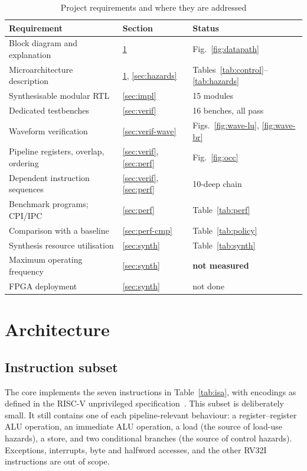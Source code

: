 \documentclass[conference]{IEEEtran}
\begin{document}
\begin{table}[t]
\centering
\caption{Project requirements and where they are addressed}
\label{tab:compliance}
\footnotesize
\begin{tabular}{@{}L{3.55cm}L{1.15cm}p{2.6cm}@{}}
\toprule
Requirement & Section & Status \\
\midrule
Block diagram and explanation & \ref{sec:arch} & Fig.~\ref{fig:datapath} \\
Microarchitecture description & \ref{sec:arch}, \ref{sec:hazards} & Tables~\ref{tab:control}--\ref{tab:hazards} \\
Synthesisable modular RTL & \ref{sec:impl} & 15 modules \\
Dedicated testbenches & \ref{sec:verif} & 16 benches, all pass \\
Waveform verification & \ref{sec:verif-wave} & Figs.~\ref{fig:wave-lu}, \ref{fig:wave-br} \\
Pipeline registers, overlap, ordering & \ref{sec:verif}, \ref{sec:perf} & Fig.~\ref{fig:occ} \\
Dependent instruction sequences & \ref{sec:verif}, \ref{sec:perf} & 10-deep chain \\
Benchmark programs; CPI/IPC & \ref{sec:perf} & Table~\ref{tab:perf} \\
Comparison with a baseline & \ref{sec:perf-cmp} & Table~\ref{tab:policy} \\
Synthesis resource utilisation & \ref{sec:synth} & Table~\ref{tab:synth} \\
Maximum operating frequency & \ref{sec:synth} & \textbf{not measured} \\
FPGA deployment & \ref{sec:synth} & not done \\
\bottomrule
\end{tabular}
\end{table}

\section{Architecture}
\label{sec:arch}

\subsection{Instruction subset}
The core implements the seven instructions in Table~\ref{tab:isa}, with encodings as defined in the RISC-V unprivileged specification~\cite{riscv-spec}. This subset is deliberately small. It still contains one of each pipeline-relevant behaviour: a register--register ALU operation, an immediate ALU operation, a load (the source of load-use hazards), a store, and two conditional branches (the source of control hazards). Exceptions, interrupts, byte and halfword accesses, and the other RV32I instructions are out of scope.
\end{document}
